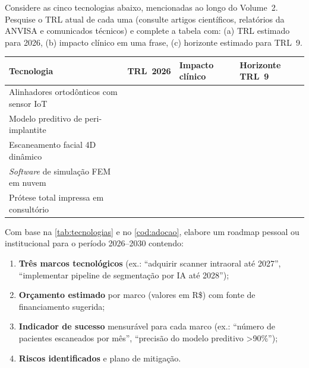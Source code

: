 \begin{exercicio}
    \label{ex:trl}
    Considere as cinco tecnologias abaixo, mencionadas ao longo
    do Volume~2. Pesquise o TRL atual de cada uma (consulte artigos
    científicos, relatórios da ANVISA e comunicados técnicos) e
    complete a tabela com: (a) TRL estimado para 2026, (b) impacto
    clínico em uma frase, (c) horizonte estimado para TRL~9.

    \begin{center}
    \begin{tabular}{lp{2.8cm}p{2.8cm}p{2.8cm}}
        \toprule
        \textbf{Tecnologia} &
        \textbf{TRL~2026} &
        \textbf{Impacto clínico} &
        \textbf{Horizonte TRL~9} \\
        \midrule
        Alinhadores ortodônticos com sensor IoT & \qquad\qquad & \qquad\qquad & \qquad\qquad \\
        Modelo preditivo de peri-implantite & & & \\
        Escaneamento facial 4D dinâmico & & & \\
        \textit{Software} de simulação FEM em nuvem & & & \\
        Prótese total impressa em consultório & & & \\
        \bottomrule
    \end{tabular}
    \end{center}
\end{exercicio}

\begin{exercicio}
    \label{ex:roadmap}
    Com base na \autoref{tab:tecnologias} e no \autoref{cod:adocao},
    elabore um roadmap pessoal ou institucional para o período
    2026--2030 contendo:

    \begin{enumerate}
        \item \textbf{Três marcos tecnológicos} (ex.: ``adquirir
            scanner intraoral até 2027'', ``implementar pipeline
            de segmentação por IA até 2028'');
        \item \textbf{Orçamento estimado} por marco (valores em
            R\$) com fonte de financiamento sugerida;
        \item \textbf{Indicador de sucesso} mensurável para cada
            marco (ex.: ``número de pacientes escaneados por
            mês'', ``precisão do modelo preditivo >90\%'');
        \item \textbf{Riscos identificados} e plano de mitigação.
    \end{enumerate}
\end{exercicio}

